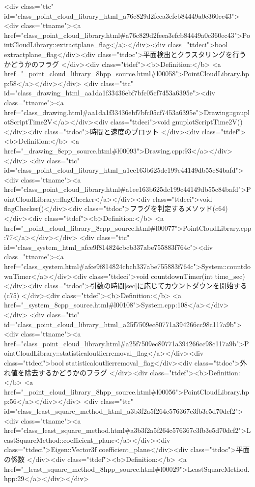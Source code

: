 <div class="ttc" id="class_point_cloud_library_html_a76c829d2feea3efcb84449a0c360ec43"><div class="ttname"><a href="class_point_cloud_library.html#a76c829d2feea3efcb84449a0c360ec43">PointCloudLibrary::extractplane_flag</a></div><div class="ttdeci">bool extractplane_flag</div><div class="ttdoc">平面検出とクラスタリングを行うかどうかのフラグ </div><div class="ttdef"><b>Definition:</b> <a href="_point_cloud_library_8hpp_source.html#l00058">PointCloudLibrary.hpp:58</a></div></div>
<div class="ttc" id="class_drawing_html_aa1da1f33436ebf7bfc05cf7453a6395e"><div class="ttname"><a href="class_drawing.html#aa1da1f33436ebf7bfc05cf7453a6395e">Drawing::gnuplotScriptTime2V</a></div><div class="ttdeci">void gnuplotScriptTime2V()</div><div class="ttdoc">時間と速度のプロット </div><div class="ttdef"><b>Definition:</b> <a href="_drawing_8cpp_source.html#l00093">Drawing.cpp:93</a></div></div>
<div class="ttc" id="class_point_cloud_library_html_a1ee163b625dc199c44149db55c84bafd"><div class="ttname"><a href="class_point_cloud_library.html#a1ee163b625dc199c44149db55c84bafd">PointCloudLibrary::flagChecker</a></div><div class="ttdeci">void flagChecker()</div><div class="ttdoc">フラグを判定するメソッド(c64) </div><div class="ttdef"><b>Definition:</b> <a href="_point_cloud_library_8cpp_source.html#l00077">PointCloudLibrary.cpp:77</a></div></div>
<div class="ttc" id="class_system_html_afce9f814824cbcb337abe755883f764c"><div class="ttname"><a href="class_system.html#afce9f814824cbcb337abe755883f764c">System::countdownTimer</a></div><div class="ttdeci">void countdownTimer(int time_sec)</div><div class="ttdoc">引数の時間[sec]に応じてカウントダウンを開始する(c75) </div><div class="ttdef"><b>Definition:</b> <a href="_system_8cpp_source.html#l00108">System.cpp:108</a></div></div>
<div class="ttc" id="class_point_cloud_library_html_a25f7509ec80771a394266cc98c117a9b"><div class="ttname"><a href="class_point_cloud_library.html#a25f7509ec80771a394266cc98c117a9b">PointCloudLibrary::statisticaloutlierremoval_flag</a></div><div class="ttdeci">bool statisticaloutlierremoval_flag</div><div class="ttdoc">外れ値を除去するかどうかのフラグ </div><div class="ttdef"><b>Definition:</b> <a href="_point_cloud_library_8hpp_source.html#l00056">PointCloudLibrary.hpp:56</a></div></div>
<div class="ttc" id="class_least_square_method_html_a3b3f2a5f264c576367c3fb3e5d70dcf2"><div class="ttname"><a href="class_least_square_method.html#a3b3f2a5f264c576367c3fb3e5d70dcf2">LeastSquareMethod::coefficient_plane</a></div><div class="ttdeci">Eigen::Vector3f coefficient_plane</div><div class="ttdoc">平面の係数 </div><div class="ttdef"><b>Definition:</b> <a href="_least_square_method_8hpp_source.html#l00029">LeastSquareMethod.hpp:29</a></div></div>
